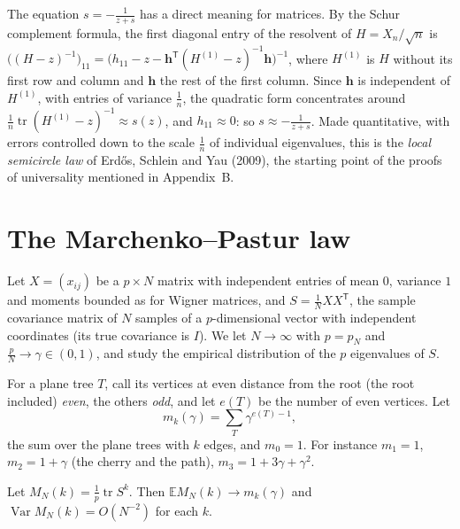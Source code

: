 \begin{remark}
The equation $s=-\frac1{z+s}$ has a direct meaning for matrices. By the Schur complement formula, the first diagonal entry of the resolvent of $H=X_n/\sqrt n$ is
$\bigl((H-z)^{-1}\bigr)_{11}=\bigl(h_{11}-z-\mathbf h^{\mathsf T}(H^{(1)}-z)^{-1}\mathbf h\bigr)^{-1}$, where $H^{(1)}$ is $H$ without its first row and column and $\mathbf h$ the rest of the first column. Since $\mathbf h$ is independent of
$H^{(1)}$, with entries of variance $\frac1n$, the quadratic form concentrates around $\frac1n\operatorname{tr}(H^{(1)}-z)^{-1}\approx s(z)$, and $h_{11}\approx0$: so $s\approx-\frac1{z+s}$. Made quantitative, with errors controlled down to the
scale $\frac1n$ of individual eigenvalues, this is the \emph{local semicircle law} of Erd\H os, Schlein and Yau (2009), the starting point of the proofs of universality mentioned in Appendix~B.
\end{remark}

\section{The Marchenko--Pastur law}

Let $X=(x_{ij})$ be a $p\times N$ matrix with independent entries of mean $0$, variance $1$ and moments bounded as for Wigner matrices, and $S=\frac1NXX^{\mathsf T}$, the sample covariance matrix of $N$ samples of a
$p$-dimensional vector with independent coordinates (its true covariance is $I$). We let $N\to\infty$ with $p=p_N$ and $\frac pN\to\gamma\in(0,1)$, and study the empirical distribution of the $p$ eigenvalues of $S$.

For a plane tree $T$, call its vertices at even distance from the root (the root included) \emph{even}, the others \emph{odd}, and let $e(T)$ be the number of even vertices. Let
\[
m_k(\gamma)=\sum_{T}\gamma^{e(T)-1},
\]
the sum over the plane trees with $k$ edges, and $m_0=1$. For instance $m_1=1$, $m_2=1+\gamma$ (the cherry and the path), $m_3=1+3\gamma+\gamma^2$.

\begin{lemma}\label{lem:mpmoments}
Let $M_N(k)=\frac1p\operatorname{tr}S^k$. Then $\mathbb EM_N(k)\to m_k(\gamma)$ and $\operatorname{Var}M_N(k)=O(N^{-2})$ for each $k$.
\end{lemma}

